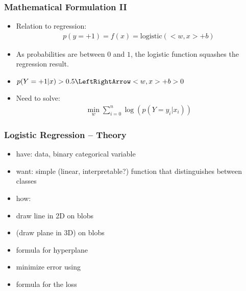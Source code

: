 \begin{frame}
    \frametitle{Mathematical Formulation II}
    \begin{itemize}
        \item Relation to regression:
            \begin{align}
                p(y=+1) = f(x) = \text{logistic}(<w, x> + b)
            \end{align}
        \item As probabilities are between $0$ and $1$, the logistic function
            squashes the regression result.
        \item $p(Y=+1 | x) > 0.5 \LeftRightArrow <w, x> + b > 0$
        \item Need to solve:
            \begin{align}
                \min_w \sum_{i=0}^n \log(p(Y=y_i | x_i))
            \end{align}
    \end{itemize}
\end{frame}

\begin{frame}
    \frametitle{Logistic Regression -- Theory}
    \begin{itemize}
        \item have: data, binary categorical variable
        \item  want: simple (linear, interpretable?) function that distinguishes between classes 
        \item  how:
        \item  draw line in 2D on blobs
        \item  (draw plane in 3D) on blobs
        \item  formula for hyperplane
        \item  minimize error using
        \item  formula for the loss
    \end{itemize}
\end{frame}

